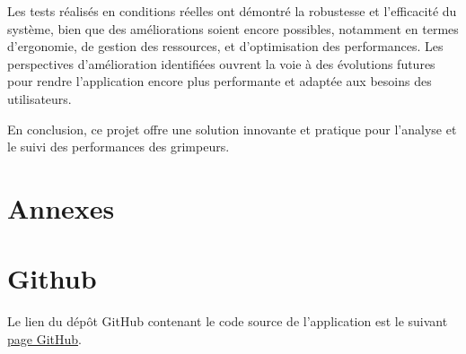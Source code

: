 \documentclass[a4paper, 11pt, french]{article}
\begin{document}
Les tests réalisés en conditions réelles ont démontré la robustesse et l'efficacité du système, bien que des améliorations soient encore possibles, notamment en termes d'ergonomie, de gestion des ressources, et d'optimisation des performances. Les perspectives d'amélioration identifiées ouvrent la voie à des évolutions futures pour rendre l'application encore plus performante et adaptée aux besoins des utilisateurs.

En conclusion, ce projet offre une solution innovante et pratique pour l'analyse et le suivi des performances des grimpeurs.


\clearpage
\newpage
\printbibliography[nottype=none]  


\clearpage
\newpage


\section*{Annexes}

\appendix

\startcontents[sections]


\section{Github}

Le lien du dépôt GitHub contenant le code source de l'application est le suivant \href{https://github.com/Romaiiin91/suiviGrimpeur_PDI}{page GitHub}.
      
\end{document}
